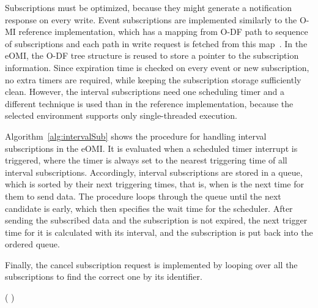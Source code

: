 Subscriptions must be optimized, because they might generate a notification response on every write. Event subscriptions are implemented similarly to the O-MI reference implementation, which has a mapping from O-DF path to sequence of subscriptions and each path in write request is fetched from this map~\cite{o-mi-node}. In the eOMI, the O-DF tree structure is reused to store a pointer to the subscription information. Since expiration time is checked on every event or new subscription, no extra timers are required, while keeping the subscription storage sufficiently clean. However, the interval subscriptions need one scheduling timer and a different technique is used than in the reference implementation, because the selected environment supports only single-threaded execution.

Algorithm~\ref{alg:intervalSub} shows the procedure for handling interval subscriptions in the eOMI. It is evaluated when a scheduled timer interrupt is triggered, where the timer is always set to the nearest triggering time of all interval subscriptions. Accordingly, interval subscriptions are stored in a queue, which is sorted by their next triggering times, that is, when is the next time for them to send data. The procedure loops through the queue until the next candidate is early, which then specifies the wait time for the scheduler. After sending the subscribed data and the subscription is not expired, the next trigger time for it is calculated with its interval, and the subscription is put back into the ordered queue. %

Finally, the cancel subscription request is implemented by looping over all the subscriptions to find the correct one by its identifier.

\begin{algorithm}[H]
  \SetAlgoLined
  ( )
  \caption{Interval subscription handling procedure; Triggered from scheduler}
  \label{alg:intervalSub}
\end{algorithm}





